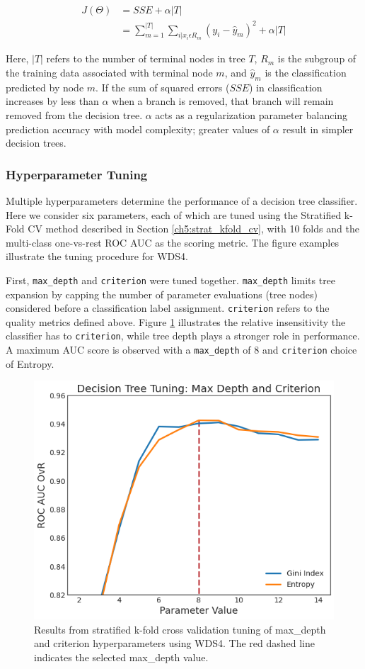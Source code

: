 \begin{equation}
\label{dtree_objective}
\begin{aligned}
    J(\Theta) &= SSE + \alpha\left|T\right| \\
    &= \sum_{m=1}^{\left|T\right|}{\sum_{i|x_i\epsilon R_m}}{(y_i-\hat{y}_m)^2+\alpha\left|T\right|}
\end{aligned}
\end{equation}

Here, $\left|T\right|$ refers to the number of terminal nodes in tree $T$, $R_m$ is the subgroup of the training data associated with terminal node $m$, and $\hat{y}_m$ is the classification predicted by node $m$. If the sum of squared errors ($SSE$) in classification increases by less than $\alpha$ when a branch is removed, that branch will remain removed from the decision tree. $\alpha$ acts as a regularization parameter balancing prediction accuracy with model complexity; greater values of $\alpha$ result in simpler decision trees.

\subsubsection{Hyperparameter Tuning} \label{ch5:dtree_tuning}
Multiple hyperparameters determine the performance of a decision tree classifier. Here we consider six parameters, each of which are tuned using the Stratified k-Fold CV method described in Section \ref{ch5:strat_kfold_cv}, with 10 folds and the multi-class one-vs-rest ROC AUC as the scoring metric. The figure examples illustrate the tuning procedure for WDS4.

First, \verb|max_depth| and \verb|criterion| were tuned together. \verb|max_depth| limits tree expansion by capping the number of parameter evaluations (tree nodes) considered before a classification label assignment. \verb|criterion| refers to the quality metrics defined above. Figure \ref{fig:dtree_maxdepth} illustrates the relative insensitivity the classifier has to \verb|criterion|, while tree depth plays a stronger role in performance. A maximum AUC score is observed with a \verb|max_depth| of 8 and \verb|criterion| choice of Entropy.

\begin{figure}[!htp]
\centering
\includegraphics[width=.6\textwidth]{templates/images/Figure-DT_tuning_maxdepth_criterion.png}
\caption[Decision tree max depth tuning]{Results from stratified k-fold cross validation tuning of max\_depth and criterion hyperparameters using WDS4. The red dashed line indicates the selected max\_depth value.}
\label{fig:dtree_maxdepth}
\end{figure}

